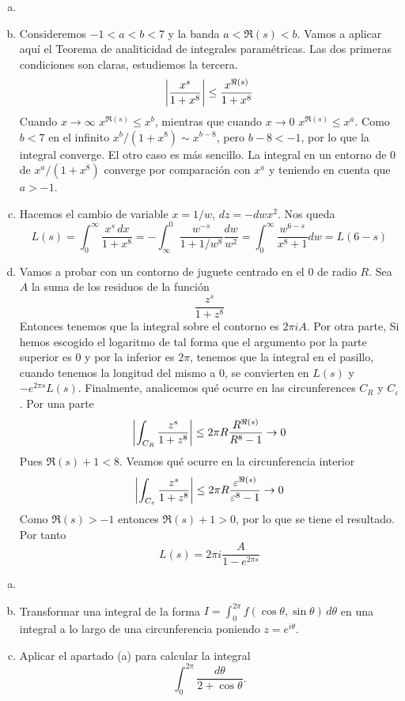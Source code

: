 \documentclass[twoside]{article}
\begin{document}
\begin{solucion}
\begin{enumerate}[a)]
\item[]
\item Consideremos $-1<a<b<7$ y la banda $a<\Re(s)<b$. Vamos a aplicar aquí el Teorema de analiticidad de integrales paramétricas. Las dos primeras condiciones son claras, estudiemos la tercera.
$$
\left\lvert\frac{x^s}{1+x^8}\right\rvert \leq \frac{x^{\Re(s)}}{1+x^8}
$$
Cuando $x\to \infty$ $x^{\Re(s)}\leq x^b$, mientras que cuando $x\to 0$ $x^{\Re(s)}\leq x^a$. Como $b<7$ en el infinito $x^b/(1+x^8) \sim x^{b-8}$, pero $b-8<-1$, por lo que la integral converge. El otro caso es más sencillo. La integral en un entorno de $0$ de $x^a/(1+x^8)$ converge por comparación con $x^a$ y teniendo en cuenta que $a>-1$.
\item Hacemos el cambio de variable $x = 1/w$, $dz = -dw x^2$. Nos queda
$$
L(s)=\int_0^\infty \frac{x^s\,dx}{1+x^8} = -\int_\infty^0 \frac{w^{-s}}{1+1/w^8}\frac{dw}{w^2}= \int_0^\infty \frac{w^{6-s}}{x^8+1}dw = L(6-s)
$$
\item Vamos a probar con un contorno de juguete centrado en el 0 de radio $R$. Sea $A$ la suma de los residuos de la función
$$
\frac{z^s}{1+z^8}
$$
Entonces tenemos que la integral sobre el contorno es $2\pi i A$. Por otra parte, Si hemos escogido el logaritmo de tal forma que el argumento por la parte superior es $0$ y por la inferior es $2\pi$, tenemos que la integral en el pasillo, cuando tenemos la longitud del mismo a $0$, se convierten en $L(s)$ y $-e^{2\pi s}L(s)$. Finalmente, analicemos qué ocurre en las circunferences $C_R$ y $C_\varepsilon$. Por una parte
$$
\left\lvert\int_{C_R}\frac{z^s}{1+z^8}\right\rvert \leq 2\pi R \frac{R^{\Re(s)}}{R^8-1} \to 0
$$
Pues $\Re(s)+1 < 8$. Veamos qué ocurre en la circunferencia interior
$$
\left\lvert\int_{C_\varepsilon}\frac{z^s}{1+z^8}\right\rvert \leq 2\pi R \frac{\varepsilon^{\Re(s)}}{\varepsilon^8-1} \to 0
$$
Como $\Re(s)>-1$ entonces $\Re(s)+1>0$, por lo que se tiene el resultado. Por tanto
$$
L(s) = 2\pi i \frac{A}{1-e^{2\pi s}}
$$
\end{enumerate}
\end{solucion}
\newpage
\begin{ejercicio}{8}
\begin{enumerate}[a)]
\item[]
\item Transformar una integral de la forma $I=\int_0^{2\pi} f(\cos\theta,\sin\theta)\,d\theta$ 
en una integral a lo largo de una circunferencia poniendo $z=e^{i\theta}$. 
\item Aplicar el apartado (a) para calcular la integral
\[\int_0^{2\pi}\frac{d\theta}{2+\cos\theta}.\]
\end{enumerate}
\end{ejercicio}
\end{document}
